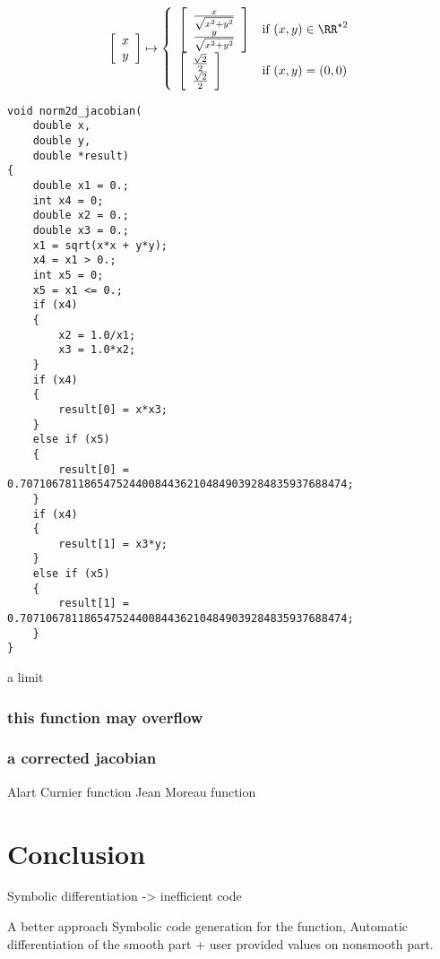 \documentclass[a4paper]{article}
\begin{document}
\begin{equation}
  \begin{array}{ll}
    \left [
      \begin{array}{c}
        x\\
        y
      \end{array} \right]
    \mapsto \left\{
        \begin{array}{ll}
          \left[
            \begin{array}{c}
            \frac{x}{\sqrt{x^2+y^2}}\\
            \frac{y}{\sqrt{x^2+y^2}}
          \end{array} \right] & \mbox{if } (x, y) \in \RR^{\star 2} \\
        \left[
          \begin{array}{c}
            \frac{\sqrt{2}}{2}\\
            \frac{\sqrt{2}}{2}
          \end{array} \right] & \mbox{if } (x, y) = (0, 0)
        
      \end{array}
    \right.
  \end{array}
\end{equation}


\begin{listing}[H] 
  \begin{verbatim}
void norm2d_jacobian(
    double x,
    double y,
    double *result)
{
    double x1 = 0.;
    int x4 = 0;
    double x2 = 0.;
    double x3 = 0.;
    x1 = sqrt(x*x + y*y);
    x4 = x1 > 0.;
    int x5 = 0;
    x5 = x1 <= 0.;
    if (x4)
    {
        x2 = 1.0/x1;
        x3 = 1.0*x2;
    }
    if (x4)
    {
        result[0] = x*x3;
    }
    else if (x5)
    {
        result[0] = 0.707106781186547524400844362104849039284835937688474;
    }
    if (x4)
    {
        result[1] = x3*y;
    }
    else if (x5)
    {
        result[1] = 0.707106781186547524400844362104849039284835937688474;
    }
}
\end{verbatim}
\caption{a limit}
\end{listing}

\subsubsection{this function may overflow}

\subsubsection{a corrected jacobian}

Alart Curnier function
Jean Moreau function

\section{Conclusion}

Symbolic differentiation -> inefficient code

A better approach Symbolic code generation for the function, Automatic
differentiation of the smooth part + user provided values on nonsmooth part.





\end{document}
